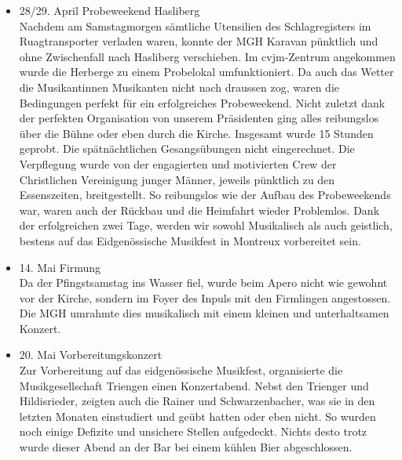\begin{history}
\begin{itemize}
            \item 28/29. April Probeweekend Hasliberg\\
                  Nachdem am Samstagmorgen sämtliche Utensilien des
                  Schlagregisters im Ruagtransporter verladen waren, konnte der
                  MGH Karavan pünktlich und ohne Zwischenfall nach Hasliberg
                  verschieben. Im cvjm-Zentrum angekommen wurde die Herberge zu
                  einem Probelokal umfunktioniert. Da auch das Wetter die
                  Musikantinnen Musikanten nicht nach draussen zog, waren die
                  Bedingungen perfekt für ein erfolgreiches Probeweekend. Nicht
                  zuletzt dank der perfekten Organisation von unserem
                  Präsidenten ging alles reibungslos über die Bühne oder eben
                  durch die Kirche. Insgesamt wurde 15 Stunden geprobt. Die
                  spätnächtlichen Gesangsübungen nicht eingerechnet. Die
                  Verpflegung wurde von der engagierten und motivierten Crew der
                  Christlichen Vereinigung junger Männer, jeweils pünktlich zu
                  den Essenszeiten, breitgestellt. So reibungslos wie der Aufbau
                  des Probeweekends war, waren auch der Rückbau und die
                  Heimfahrt wieder Problemlos. Dank der erfolgreichen zwei Tage,
                  werden wir sowohl Musikalisch als auch geistlich, bestens auf
                  das Eidgenössische Musikfest in Montreux vorbereitet sein.

            \item 14. Mai Firmung\\
                  Da der Pfingstsamstag ins Wasser fiel, wurde beim Apero nicht
                  wie gewohnt vor der Kirche, sondern im Foyer des Inpuls mit
                  den Firmlingen angestossen. Die MGH umrahmte dies musikalisch
                  mit einem kleinen und unterhaltsamen Konzert.

            \item 20. Mai Vorbereitungskonzert\\
                  Zur Vorbereitung auf das eidgenössische Musikfest,
                  organisierte die Musikgesellschaft Triengen einen
                  Konzertabend. Nebst den Trienger und Hildisrieder, zeigten
                  auch die Rainer und Schwarzenbacher, was sie in den letzten
                  Monaten einstudiert und geübt hatten oder eben nicht. So
                  wurden noch einige Defizite und unsichere Stellen aufgedeckt.
                  Nichts desto trotz wurde dieser Abend an der Bar bei einem
                  kühlen Bier abgeschlossen.


\end{itemize}
\end{history}
